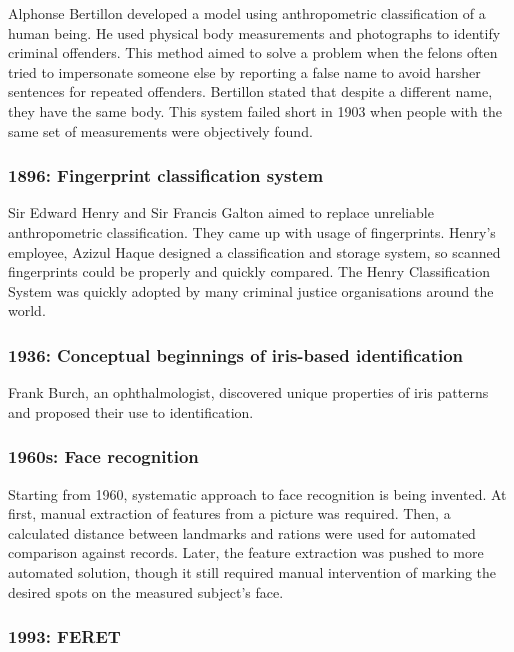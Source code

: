 Alphonse Bertillon developed a model using anthropometric classification of a human being. He used physical body measurements and photographs to identify criminal offenders. This method aimed to solve a problem when the felons often tried to impersonate someone else by reporting a false name to avoid harsher sentences for repeated offenders. Bertillon stated that despite a different name, they have the same body. This system failed short in 1903 when people with the same set of measurements were objectively found.

\subsubsection{1896: Fingerprint classification system}

Sir Edward Henry and Sir Francis Galton aimed to replace unreliable anthropometric classification. They came up with usage of fingerprints. Henry's employee, Azizul Haque designed a classification and storage system, so scanned fingerprints could be properly and quickly compared. The Henry Classification System was quickly adopted by many criminal justice organisations around the world.

\subsubsection{1936: Conceptual beginnings of iris-based identification}

Frank Burch, an ophthalmologist, discovered unique properties of iris patterns and proposed their use to identification.

\subsubsection{1960s: Face recognition}

Starting from 1960, systematic approach to face recognition is being invented. At first, manual extraction of features from a picture was required. Then, a calculated distance between landmarks and rations were used for automated comparison against records. Later, the feature extraction was pushed to more automated solution, though it still required manual intervention of marking the desired spots on the measured subject's face.

\subsubsection{1993: FERET}

